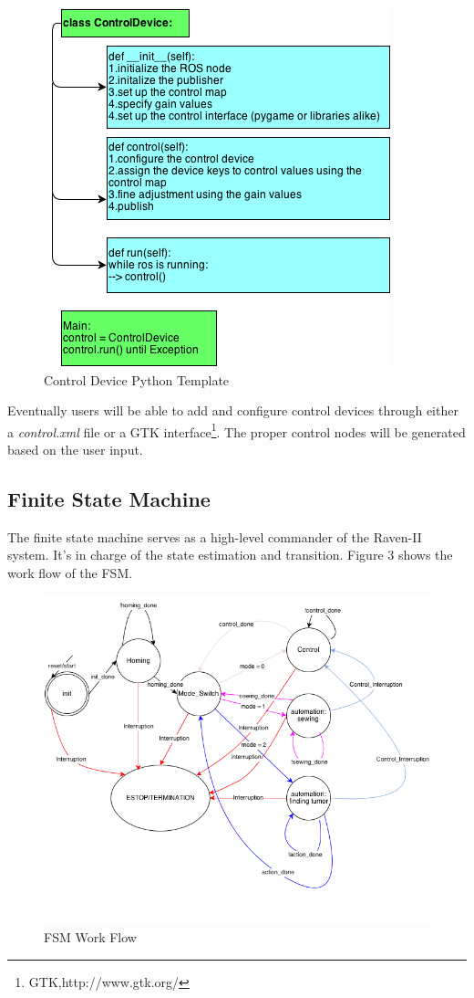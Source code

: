 \documentclass[letterpaper,twocolumn,10pt]{article}
\begin{document}
\begin{figure}[h]
\includegraphics[scale=0.6]{ControlDeviceTemplate.png}
\caption{Control Device Python Template}
\end{figure}

Eventually users will be able to add and configure control devices
through either a {\it control.xml} file or a GTK
interface\footnote{GTK,http://www.gtk.org/}. The proper control nodes
will be generated based on the user input.

\subsection{Finite State Machine}

The finite state machine serves as a high-level commander of the
Raven-II system. It's in charge of the state estimation and
transition. Figure 3 shows the work flow of the FSM.

\begin{figure}[h]
\includegraphics[scale=0.4]{FSM.png}
\caption{FSM Work Flow}
\end{figure}
\end{document}
